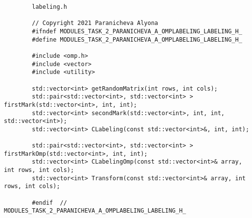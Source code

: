 \documentclass{report}
\begin{document}
\begin{lstlisting}
	    labeling.h
	      
	    // Copyright 2021 Paranicheva Alyona
	    #ifndef MODULES_TASK_2_PARANICHEVA_A_OMPLABELING_LABELING_H_
	    #define MODULES_TASK_2_PARANICHEVA_A_OMPLABELING_LABELING_H_
	    
	    #include <omp.h>
	    #include <vector>
	    #include <utility>
	    
	    std::vector<int> getRandomMatrix(int rows, int cols);
	    std::pair<std::vector<int>, std::vector<int> > firstMark(std::vector<int>, int, int);
	    std::vector<int> secondMark(std::vector<int>, int, int, std::vector<int>);
	    std::vector<int> CLabeling(const std::vector<int>&, int, int);
	    
	    std::pair<std::vector<int>, std::vector<int> > firstMarkOmp(std::vector<int>, int, int);
	    std::vector<int> CLabelingOmp(const std::vector<int>& array, int rows, int cols);
	    std::vector<int> Transform(const std::vector<int>& array, int rows, int cols);
	    
	    #endif  // MODULES_TASK_2_PARANICHEVA_A_OMPLABELING_LABELING_H_
	\end{lstlisting}
\end{document}
